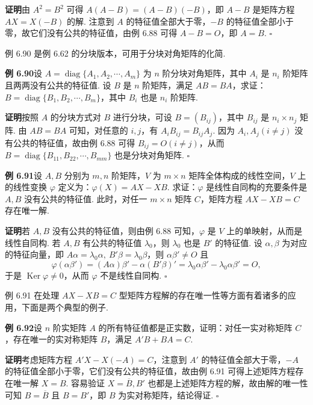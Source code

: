\documentclass[UTF8,12pt,a4paper,fontset=fandol]{ctexart}
\begin{document}
\noindent\textbf{证明}\quad 由 $A^2=B^2$ 可得 $A(A-B)=(A-B)(-B)$，即 $A-B$ 是矩阵方程 $AX=X(-B)$ 的解. 注意到 $A$ 的特征值全部大于零，$-B$ 的特征值全部小于零，故它们没有公共的特征值，由例 6.88 可得 $A-B=O$，即 $A=B$. $\square$

例 6.90 是例 6.62 的分块版本，可用于分块对角矩阵的化简.

\noindent\textbf{例 6.90}\quad 设 $A=\operatorname{diag}\{A_1,A_2,\cdots,A_m\}$ 为 $n$ 阶分块对角矩阵，其中 $A_i$ 是 $n_i$ 阶矩阵且两两没有公共的特征值. 设 $B$ 是 $n$ 阶矩阵，满足 $AB=BA$，求证：$B=\operatorname{diag}\{B_1,B_2,\cdots,B_m\}$，其中 $B_i$ 也是 $n_i$ 阶矩阵.

\noindent\textbf{证明}\quad 按照 $A$ 的分块方式对 $B$ 进行分块，可设 $B=(B_{ij})$，其中 $B_{ij}$ 是 $n_i\times n_j$ 矩阵. 由 $AB=BA$ 可知，对任意的 $i,j$，有 $A_iB_{ij}=B_{ij}A_j$. 因为 $A_i,A_j(i\ne j)$ 没有公共的特征值，故由例 6.88 可得 $B_{ij}=O(i\ne j)$，从而 $B=\operatorname{diag}\{B_{11},B_{22},\cdots,B_{mm}\}$ 也是分块对角矩阵. $\square$

\noindent\textbf{例 6.91}\quad 设 $A,B$ 分别为 $m,n$ 阶矩阵，$V$ 为 $m\times n$ 矩阵全体构成的线性空间，$V$ 上的线性变换 $\varphi$ 定义为：$\varphi(X)=AX-XB$. 求证：$\varphi$ 是线性自同构的充要条件是 $A,B$ 没有公共的特征值. 此时，对任一 $m\times n$ 矩阵 $C$，矩阵方程 $AX-XB=C$ 存在唯一解.

\noindent\textbf{证明}\quad 若 $A,B$ 没有公共的特征值，则由例 6.88 可知，$\varphi$ 是 $V$ 上的单映射，从而是线性自同构. 若 $A,B$ 有公共的特征值 $\lambda_0$，则 $\lambda_0$ 也是 $B'$ 的特征值. 设 $\alpha,\beta$ 为对应的特征向量，即 $A\alpha=\lambda_0\alpha,\ B'\beta=\lambda_0\beta$，则 $\alpha\beta'\ne O$ 且
\[
\varphi(\alpha\beta')=(A\alpha)\beta'-\alpha(B'\beta)'=\lambda_0\alpha\beta'-\lambda_0\alpha\beta'=O,
\]
于是 $\operatorname{Ker}\varphi\ne 0$，从而 $\varphi$ 不是线性自同构. $\square$

例 6.91 在处理 $AX-XB=C$ 型矩阵方程解的存在唯一性等方面有着诸多的应用，下面是两个典型的例子.

\noindent\textbf{例 6.92}\quad 设 $n$ 阶实矩阵 $A$ 的所有特征值都是正实数，证明：对任一实对称矩阵 $C$，存在唯一的实对称矩阵 $B$，满足 $A'B+BA=C$.

\noindent\textbf{证明}\quad 考虑矩阵方程 $A'X-X(-A)=C$，注意到 $A'$ 的特征值全部大于零，$-A$ 的特征值全部小于零，它们没有公共的特征值，故由例 6.91 可得上述矩阵方程存在唯一解 $X=B$. 容易验证 $X=\overline{B},B'$ 也都是上述矩阵方程的解，故由解的唯一性可知 $B=\overline{B}$ 且 $B=B'$，即 $B$ 为实对称矩阵，结论得证. $\square$
\end{document}
